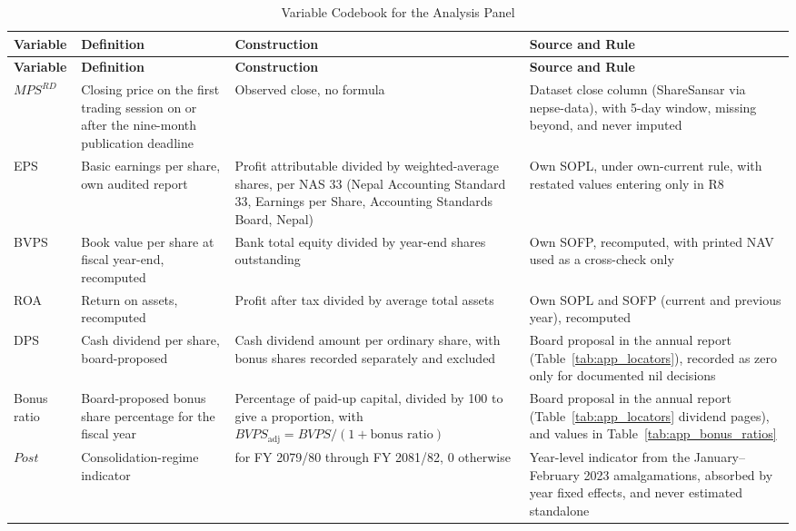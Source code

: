 {\small
\setlength{\tabcolsep}{4pt}
\begin{longtable}{>{\raggedright\arraybackslash}p{}>{\raggedright\arraybackslash}p{}>{\raggedright\arraybackslash}p{}>{\raggedright\arraybackslash}p{}}
\caption{Variable Codebook for the Analysis Panel}
\label{tab:app_codebook}\\
\toprule
\textbf{Variable} & \textbf{Definition} & \textbf{Construction} & \textbf{Source and Rule} \\
\midrule
\endfirsthead
\textbf{Variable} & \textbf{Definition} & \textbf{Construction} & \textbf{Source and Rule} \\
\midrule
\endhead
$\mathit{MPS}^{RD}$ & Closing price on the first trading session on or after the nine-month publication deadline & Observed close, no formula & Dataset close column (ShareSansar via nepse-data), with 5-day window, missing beyond, and never imputed \\
\addlinespace
EPS & Basic earnings per share, own audited report & Profit attributable divided by weighted-average shares, per NAS 33 (Nepal Accounting Standard 33, Earnings per Share, Accounting Standards Board, Nepal) & Own SOPL, under own-current rule, with restated values entering only in R8 \\
\addlinespace
BVPS & Book value per share at fiscal year-end, recomputed & Bank total equity divided by year-end shares outstanding & Own SOFP, recomputed, with printed NAV used as a cross-check only \\
\addlinespace
ROA & Return on assets, recomputed & Profit after tax divided by average total assets & Own SOPL and SOFP (current and previous year), recomputed \\
\addlinespace
DPS & Cash dividend per share, board-proposed & Cash dividend amount per ordinary share, with bonus shares recorded separately and excluded & Board proposal in the annual report (Table~\ref{tab:app_locators}), recorded as zero only for documented nil decisions \\
\addlinespace
Bonus ratio & Board-proposed bonus share percentage for the fiscal year & Percentage of paid-up capital, divided by 100 to give a proportion, with $\mathit{BVPS}_{\text{adj}} = \mathit{BVPS} / (1 + \text{bonus ratio})$ & Board proposal in the annual report (Table~\ref{tab:app_locators} dividend pages), and values in Table~\ref{tab:app_bonus_ratios} \\
\addlinespace
$\mathit{Post}$ & Consolidation-regime indicator & 1 for FY 2079/80 through FY 2081/82, 0 otherwise & Year-level indicator from the January--February 2023 amalgamations, absorbed by year fixed effects, and never estimated standalone \\
\bottomrule
\end{longtable}}

